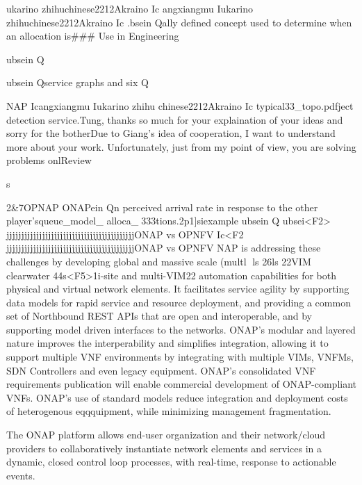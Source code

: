     ukarino zhihuchinese2212Akraino Ic
    angxiangmu
    Iukarino zhihuchinese2212Akraino Ic
    .bsein Qally defined concept used to determine when an allocation is### Use in Engineering

    ubsein Q






    ubsein  Qservice graphs and six
    Q


    NAP Icangxiangmu
    Iukarino zhihu
    chinese2212Akraino Ic
    typical33_topo.pdfject detection service.Tung, thanks so much for your explaination of your ideas and sorry for the
    botherDue to Giang's idea of cooperation, I want to understand more about your work. Unfortunately, just from my point
    of view, you are solving problems  onlReview


    s

    2&7OPNAP
    ONAPein Qn perceived arrival rate in response to the other player'squeue_model_ alloca_333tions.2p1]siexample
    ubsein Q
    ubsei<F2>
    jjjjjjjjjjjjjjjjjjjjjjjjjjjjjjjjjjjjjjjjjjjONAP vs OPNFV
    Ic<F2
    jjjjjjjjjjjjjjjjjjjjjjjjjjjjjjjjjjjjjjjjjjjONAP vs OPNFV
    NAP is addressing these challenges by developing global and massive scale
    (multl
    ls
    26ls
    22VIM clearwater
    44s<F5>1i-site and multi-VIM22 automation capabilities for both physical and
    virtual network elements. It facilitates service agility by supporting
    data models for rapid service and resource deployment, and providing a
    common set of Northbound REST APIs that are open and interoperable, and by
    supporting model driven interfaces to the networks. ONAP's modular and
    layered nature improves the interperability and simplifies integration,
    allowing it to support multiple VNF environments by integrating with
    multiple VIMs, VNFMs, SDN Controllers and even legacy equipment. ONAP's
    consolidated VNF requirements publication will enable commercial
    development of ONAP-compliant VNFs. ONAP's use of standard models reduce
    integration and deployment costs of heterogenous eqqquipment, while
    minimizing management fragmentation.















    The ONAP platform allows end-user organization and their network/cloud
    providers to collaboratively instantiate network elements and services in
    a dynamic, closed control loop processes, with real-time, response to
    actionable events.

